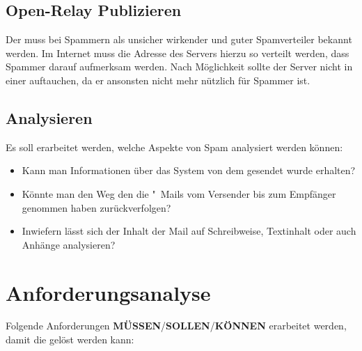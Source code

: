 \documentclass[a4paper,11pt,singlespacing]{article}
\begin{document}
	\subsection{Open-Relay Publizieren}\label{sec:ProblemstellungPublizieren}
		Der  muss bei Spammern als unsicher wirkender  und guter Spamverteiler bekannt werden.
		Im Internet muss die Adresse des Servers hierzu so verteilt werden, dass Spammer darauf aufmerksam werden.
		Nach Möglichkeit sollte der Server nicht in einer   auftauchen, da er ansonsten nicht mehr nützlich für Spammer ist.

	\subsection{Analysieren}\label{sec:ProblemstellungAnalysieren}
		Es soll erarbeitet werden, welche Aspekte von Spam analysiert werden können:
		\begin{itemize}
		\item Kann man Informationen über das System von dem gesendet wurde erhalten?
		\item Könnte man den Weg den die "~Mails vom Versender bis zum Empfänger genommen haben zurückverfolgen?
		\item Inwiefern lässt sich der Inhalt der Mail auf Schreibweise, Textinhalt oder auch Anhänge analysieren?
		\end{itemize}


\section{Anforderungsanalyse}\label{sec:Anforderungsanalyse}
	Folgende Anforderungen \textbf{MÜSSEN}/\textbf{SOLLEN}/\textbf{KÖNNEN} erarbeitet werden, damit die  gelöst werden kann:
\end{document}
